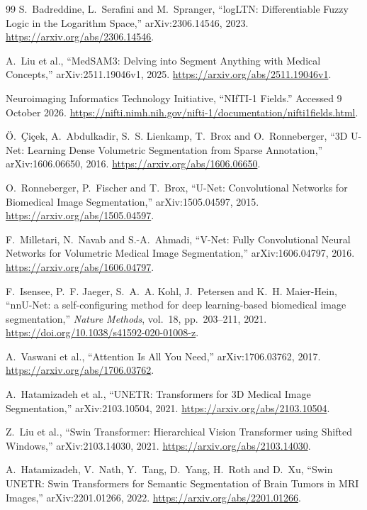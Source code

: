 \documentclass[12pt,a4paper]{article}
\begin{document}
\begin{thebibliography}{99}
S.~Badreddine, L.~Serafini and M.~Spranger,
``logLTN: Differentiable Fuzzy Logic in the Logarithm Space,''
arXiv:2306.14546, 2023. \url{https://arxiv.org/abs/2306.14546}.

A.~Liu et al., ``MedSAM3: Delving into Segment Anything with Medical
Concepts,'' arXiv:2511.19046v1, 2025.
\url{https://arxiv.org/abs/2511.19046v1}.

Neuroimaging Informatics Technology Initiative, ``NIfTI-1 Fields.''
Accessed 9 October 2026.
\url{https://nifti.nimh.nih.gov/nifti-1/documentation/nifti1fields.html}.

\"O.~\c{C}i\c{c}ek, A.~Abdulkadir, S.~S. Lienkamp, T.~Brox and
O.~Ronneberger, ``3D U-Net: Learning Dense Volumetric Segmentation from
Sparse Annotation,'' arXiv:1606.06650, 2016.
\url{https://arxiv.org/abs/1606.06650}.

O.~Ronneberger, P.~Fischer and T.~Brox, ``U-Net: Convolutional Networks
for Biomedical Image Segmentation,'' arXiv:1505.04597, 2015.
\url{https://arxiv.org/abs/1505.04597}.

F.~Milletari, N.~Navab and S.-A.~Ahmadi, ``V-Net: Fully Convolutional
Neural Networks for Volumetric Medical Image Segmentation,''
arXiv:1606.04797, 2016. \url{https://arxiv.org/abs/1606.04797}.

F.~Isensee, P.~F. Jaeger, S.~A.~A. Kohl, J.~Petersen and K.~H. Maier-Hein,
``nnU-Net: a self-configuring method for deep learning-based biomedical
image segmentation,'' \emph{Nature Methods}, vol.~18, pp.~203--211, 2021.
\url{https://doi.org/10.1038/s41592-020-01008-z}.

A.~Vaswani et al., ``Attention Is All You Need,'' arXiv:1706.03762,
2017. \url{https://arxiv.org/abs/1706.03762}.

A.~Hatamizadeh et al., ``UNETR: Transformers for 3D Medical Image
Segmentation,'' arXiv:2103.10504, 2021.
\url{https://arxiv.org/abs/2103.10504}.

Z.~Liu et al., ``Swin Transformer: Hierarchical Vision Transformer using
Shifted Windows,'' arXiv:2103.14030, 2021.
\url{https://arxiv.org/abs/2103.14030}.

A.~Hatamizadeh, V.~Nath, Y.~Tang, D.~Yang, H.~Roth and D.~Xu,
``Swin UNETR: Swin Transformers for Semantic Segmentation of Brain Tumors
in MRI Images,'' arXiv:2201.01266, 2022.
\url{https://arxiv.org/abs/2201.01266}.


\end{thebibliography}
\end{document}

